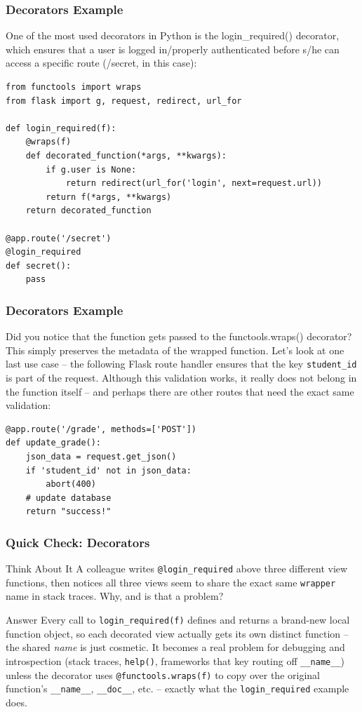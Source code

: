 \begin{frame}[fragile]\frametitle{Decorators Example}
One of the most used decorators in Python is the login\_required() decorator, which ensures that a user is logged in/properly authenticated before s/he can access a specific route (/secret, in this case):
        \begin{lstlisting}
from functools import wraps
from flask import g, request, redirect, url_for

def login_required(f):
    @wraps(f)
    def decorated_function(*args, **kwargs):
        if g.user is None:
            return redirect(url_for('login', next=request.url))
        return f(*args, **kwargs)
    return decorated_function

@app.route('/secret')
@login_required
def secret():
    pass
\end{lstlisting}
\end{frame}


\begin{frame}[fragile]\frametitle{Decorators Example}
Did you notice that the function gets passed to the functools.wraps() decorator? This simply
preserves the metadata of the wrapped function. Let's look at one last use case -- the following
Flask route handler ensures that the key \texttt{student\_id} is part of the request. Although
this validation works, it really does not belong in the function itself -- and perhaps there are
other routes that need the exact same validation:
        \begin{lstlisting}
@app.route('/grade', methods=['POST'])
def update_grade():
    json_data = request.get_json()
    if 'student_id' not in json_data:
        abort(400)
    # update database
    return "success!"
\end{lstlisting}
\end{frame}

\begin{frame}[fragile]\frametitle{Quick Check: Decorators}
\begin{block}{Think About It}
A colleague writes \lstinline|@login_required| above three different view functions, then
notices all three views seem to share the exact same \texttt{wrapper} name in stack traces. Why,
and is that a problem?
\end{block}
\pause
\begin{block}{Answer}
Every call to \lstinline|login_required(f)| defines and returns a brand-new local function
object, so each decorated view actually gets its own distinct function -- the shared \emph{name}
is just cosmetic. It becomes a real problem for debugging and introspection (stack traces,
\lstinline|help()|, frameworks that key routing off \texttt{\_\_name\_\_}) unless the decorator
uses \lstinline|@functools.wraps(f)| to copy over the original function's \texttt{\_\_name\_\_},
\texttt{\_\_doc\_\_}, etc. -- exactly what the \lstinline|login_required| example does.
\end{block}
\end{frame}

